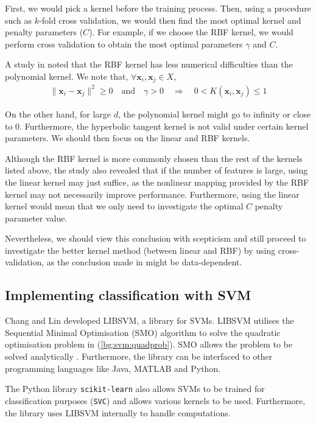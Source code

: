 \documentclass[12pt, twoside, a4paper]{report}
\def\vec{\boldsymbol}
\begin{document}
First, we would pick a kernel before the training process. Then, using a procedure such as $k$-fold cross validation, we would then find the most optimal kernel and penalty parameters ($C$). For example, if we choose the RBF kernel, we would  perform cross validation to obtain the most optimal parameters $\gamma$ and $C$.

A study in \cite{RefWorks:128} noted that the RBF kernel has less numerical difficulties than the polynomial kernel. We note that, $\forall \vec{x}_i, \vec{x}_j \in X$,
\begin{align*}
\| \vec{x}_i - \vec{x}_j \|^2 \geq 0 \quad \text{and} \quad \gamma > 0 \quad \Rightarrow \quad 0 < K(\vec{x}_i, \vec{x}_j) \leq 1 
\end{align*}

On the other hand, for large $d$, the polynomial kernel might go to infinity or close to 0. Furthermore, the hyperbolic tangent kernel is not valid under certain kernel parameters. We should then focus on the linear and RBF kernels.

Although the RBF kernel is more commonly chosen than the rest of the kernels listed above, the study also revealed that if the number of features is large, using the linear kernel may just suffice, as the nonlinear mapping provided by the RBF kernel may not necessarily improve performance. Furthermore, using the linear kernel would mean that we only need to investigate the optimal $C$ penalty parameter value.

Nevertheless, we should view this conclusion with scepticism and still proceed to investigate the better kernel method (between linear and RBF) by using cross-validation, as the conclusion made in \cite{RefWorks:128} might be data-dependent.

\subsection{Implementing classification with SVM}
Chang and Lin \cite{libsvm} developed LIBSVM, a library for SVMs. LIBSVM utilises the Sequential Minimal Optimisation (SMO) algorithm to solve the quadratic optimisation problem in (\ref{bg:svm:quadprob}). SMO allows the problem to be solved analytically \cite{RefWorks:126}. Furthermore, the library can be interfaced to other programming languages like Java, MATLAB and Python.

The Python library \texttt{scikit-learn} also allows SVMs to be trained for classification purposes (\texttt{SVC}) and allows various kernels to be used. Furthermore, the library uses LIBSVM internally to handle computations.
\end{document}
